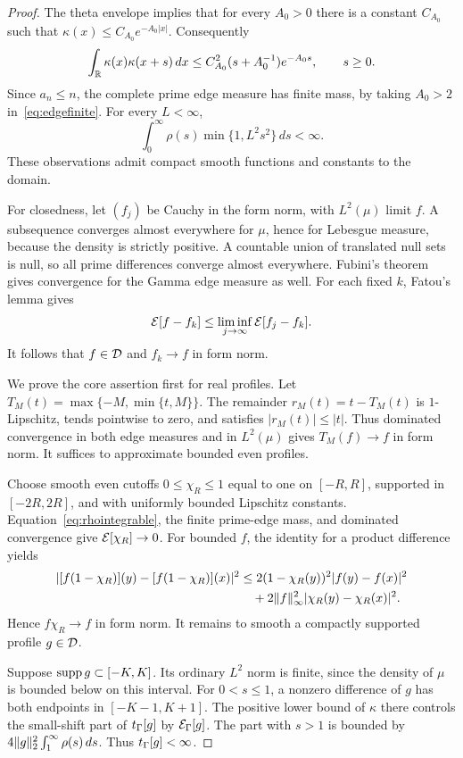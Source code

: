 \begin{proof}
The theta envelope implies that for every $A_0>0$ there is a constant $C_{A_0}$ such that $\kappa(x)\le C_{A_0}e^{-A_0|x|}$. Consequently
\begin{equation}\label{eq:edgefinite}
 \int_\mathbb R\kappa(x)\kappa(x+s)\,dx
 \le C_{A_0}^2(s+A_0^{-1})e^{-A_0s},\qquad s\ge0.
\end{equation}
Since $a_n\le n$, the complete prime edge measure has finite mass, by taking $A_0>2$ in~\eqref{eq:edgefinite}. For every $L<\infty$,
\begin{equation}\label{eq:rhointegrable}
 \int_0^\infty\rho(s)\min\{1,L^2s^2\}\,ds<\infty.
\end{equation}
These observations admit compact smooth functions and constants to the domain.

For closedness, let $(f_j)$ be Cauchy in the form norm, with $L^2(\mu)$ limit $f$. A subsequence converges almost everywhere for $\mu$, hence for Lebesgue measure, because the density is strictly positive. A countable union of translated null sets is null, so all prime differences converge almost everywhere. Fubini's theorem gives convergence for the Gamma edge measure as well. For each fixed $k$, Fatou's lemma gives
\[
 \mathcal E[f-f_k]\le\liminf_{j\to\infty}\mathcal E[f_j-f_k].
\]
It follows that $f\in\mathcal D$ and $f_k\to f$ in form norm.

We prove the core assertion first for real profiles. Let $T_M(t)=\max\{-M,\min\{t,M\}\}$. The remainder $r_M(t)=t-T_M(t)$ is $1$-Lipschitz, tends pointwise to zero, and satisfies $|r_M(t)|\le|t|$. Thus dominated convergence in both edge measures and in $L^2(\mu)$ gives $T_M(f)\to f$ in form norm. It suffices to approximate bounded even profiles.

Choose smooth even cutoffs $0\le\chi_R\le1$ equal to one on $[-R,R]$, supported in $[-2R,2R]$, and with uniformly bounded Lipschitz constants. Equation~\eqref{eq:rhointegrable}, the finite prime-edge mass, and dominated convergence give $\mathcal E[\chi_R]\to0$. For bounded $f$, the identity for a product difference yields
\begin{align*}
 |[f(1-\chi_R)](y)-[f(1-\chi_R)](x)|^2
 &\le2(1-\chi_R(y))^2|f(y)-f(x)|^2\\
 &\quad+2\lVert f\rVert_\infty^2|\chi_R(y)-\chi_R(x)|^2.
\end{align*}
Hence $f\chi_R\to f$ in form norm. It remains to smooth a compactly supported profile $g\in\mathcal D$.

Suppose $\operatorname{supp} g\subset[-K,K]$. Its ordinary $L^2$ norm is finite, since the density of $\mu$ is bounded below on this interval. For $0<s\le1$, a nonzero difference of $g$ has both endpoints in $[-K-1,K+1]$. The positive lower bound of $\kappa$ there controls the small-shift part of $t_\Gamma[g]$ by $\mathcal E_\Gamma[g]$. The part with $s>1$ is bounded by $4\lVert g\rVert_2^2\int_1^\infty\rho(s)\,ds$. Thus $t_\Gamma[g]<\infty$.


\end{proof}
